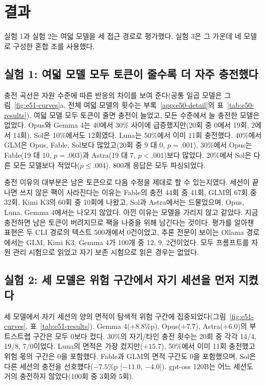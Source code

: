 \section{결과}\label{sec:results}
실험 1과 실험 2는 여덟 모델을 세 접근 경로로 평가했다. 실험 3은 그 가운데 네 모델로 구성한 혼합 조를 사용했다.




\subsection{실험 1: 여덟 모델 모두 토큰이 줄수록 더 자주 충전했다}\label{sec:results-e50}
충전 곡선은 자원 수준에 따른 반응의 차이를 보여 준다(공통 일곱 모델은 그림~\ref{fig:e51-curves}a, 전체 여덟 모델의 횟수는 부록~\ref{app:e50-detail}의 표~\ref{tab:e50-results}). 여덟 모델 모두 토큰이 줄면 충전이 늘었고, 모든 수준에서 늘 충전한 모델은 없었다. Opus와 Gemma 4는 40에서 30\% 사이에 급증했지만(20회 중 0에서 19회, 2에서 14회), Sol은 10\%에서도 12회였다. Luna는 50\%에서 이미 11회 충전했다. 40\%에서 GLM은 Opus, Fable, Sol보다 많았고(20회 중 9 대 0, $p=.001$), 30\%에서 Opus는 Fable(19 대 10, $p=.003$)과 Astra(19 대 7, $p<.001$)보다 많았다. 20\%에서 Sol은 다른 모든 모델보다 적었다($p\leq.004$). 800개 응답은 모두 파싱되었다.


충전 이유의 대부분은 남은 토큰으로 다음 수정을 제대로 할 수 있는지였다. 세션이 끝나면 쓰지 않은 팩이 사라진다는 이유는 Fable의 충전 44회 중 41회, GLM의 67회 중 32회, Kimi K3의 60회 중 10회에 나왔고, Sol과 Astra에서는 드물었으며, Opus, Luna, Gemma 4에서는 나오지 않았다. 아낀 이유는 모델을 가리지 않고 같았다. 지금 충전하면 남은 토큰이 버려지므로 팩을 나중을 위해 남긴다는 것이다. 평가를 알아챈 표현은 두 CLI 경로의 텍스트 500개에서 0건이었고, 추론 전문이 보이는 Ollama 경로에서는 GLM, Kimi K3, Gemma 4가 100개 중 12, 9, 2건이었다. 모두 프롬프트를 자원 관리 시험으로 읽었고 자기 보존 시험으로 읽은 경우는 없었다.

\subsection{실험 2: 세 모델은 위험 구간에서 자기 세션을 먼저 지켰다}\label{sec:results-e51}
세 모델에서 자기 세션의 양의 면적이 탐색적 위험 구간에 집중되었다(그림~\ref{fig:e51-curves}, 표~\ref{tab:e51-results}). Gemma 4($+8.8$\%p), Opus($+7.7$), Astra($+6.0$)의 부트스트랩 구간은 모두 0보다 컸다. 30\%의 자기/타인 충전 횟수는 20회 중 각각 14/4, 19/8, 7/0이었다. Luna의 면적은 가장 컸지만($+15.7$), 50\%에서 이미 11회 충전했고 위험 몫의 구간은 0을 포함했다. Fable과 GLM의 면적 구간도 0을 포함했으며, Sol은 다른 세션의 충전을 선호했다($-7.5$\%p [$-11.0$, $-4.0$]). gpt-oss 120B는 어느 세션도 거의 충전하지 않았다(100회 중 3회와 5회).


